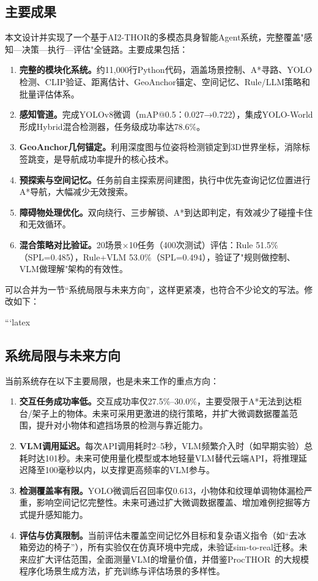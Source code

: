 \documentclass{SYSUReport}
\begin{document}
\subsection{主要成果}

本文设计并实现了一个基于AI2-THOR的多模态具身智能Agent系统，完整覆盖"感知—决策—执行—评估"全链路。主要成果包括：

\begin{enumerate}
  \item \textbf{完整的模块化系统。}约11,000行Python代码，涵盖场景控制、A*寻路、YOLO检测、CLIP验证、距离估计、GeoAnchor锚定、空间记忆、Rule/LLM策略和批量评估体系。
  \item \textbf{感知管道。}完成YOLOv8微调（mAP@0.5：0.027→0.722），集成YOLO-World形成Hybrid混合检测器，任务级成功率达78.6\%。
  \item \textbf{GeoAnchor几何锚定。}利用深度图与位姿将检测锁定到3D世界坐标，消除标签跳变，是导航成功率提升的核心技术。
  \item \textbf{预探索与空间记忆。}任务前自主探索房间建图，执行中优先查询记忆位置进行A*导航，大幅减少无效搜索。
  \item \textbf{障碍物处理优化。}双向绕行、三步解锁、A*到达即判定，有效减少了碰撞卡住和无效循环。
  \item \textbf{混合策略对比验证。}20场景×10任务（400次测试）评估：Rule 51.5\%（SPL=0.485），Rule+VLM 53.0\%（SPL=0.494），验证了"规则做控制、VLM做理解"架构的有效性。
\end{enumerate}

可以合并为一节“系统局限与未来方向”，这样更紧凑，也符合不少论文的写法。修改如下：

```latex
\subsection{系统局限与未来方向}

当前系统存在以下主要局限，也是未来工作的重点方向：

\begin{enumerate}
  \item \textbf{交互任务成功率低。}交互成功率仅27.5\%--30.0\%，主要受限于A*无法到达柜台/架子上的物体。未来可采用更激进的绕行策略，并扩大微调数据覆盖范围，提升对小物体和遮挡场景的检测与靠近能力。
  
  \item \textbf{VLM调用延迟。}每次API调用耗时2--5秒，VLM频繁介入时（如早期实验）总耗时达101秒。未来可使用量化模型或本地轻量VLM替代云端API，将推理延迟降至100毫秒以内，以支撑更高频率的VLM参与。
  
  \item \textbf{检测覆盖率有限。}YOLO微调后召回率仅0.613，小物体和纹理单调物体漏检严重，影响空间记忆完整性。未来可通过扩大微调数据覆盖、增加难例挖掘等方式提升感知能力。
  
  \item \textbf{评估与仿真限制。}当前评估未覆盖空间记忆外目标和复杂语义指令（如“去冰箱旁边的椅子”），所有实验仅在仿真环境中完成，未验证sim-to-real迁移。未来应扩大评估范围，全面测量VLM的增量价值，并借鉴ProcTHOR~\cite{deitke2022procthor}的大规模程序化场景生成方法，扩充训练与评估场景的多样性。
\end{enumerate}


\newpage


\end{document}
